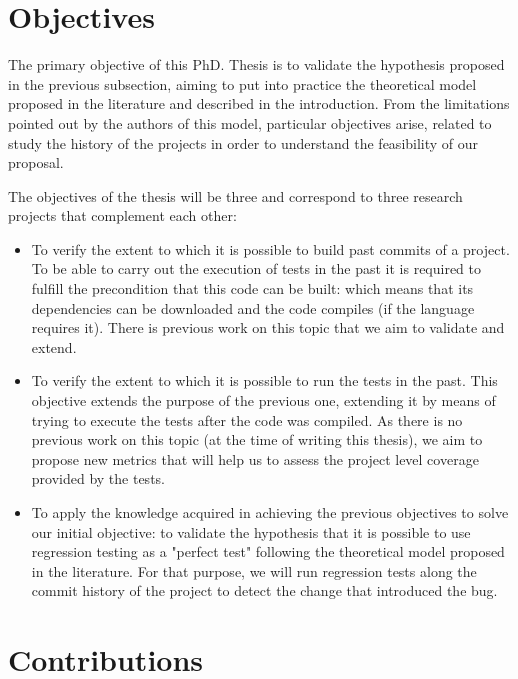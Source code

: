 \section{Objectives}

The primary objective of this PhD. Thesis is to validate the hypothesis proposed in the previous subsection, aiming to put into practice the theoretical model proposed in the literature and described in the introduction. 
From the limitations pointed out by the authors of this model, particular objectives arise, related to study the history of the projects in order to understand the feasibility of our proposal.

The objectives of the thesis will be three and correspond to three research projects that complement each other:

\begin{itemize}
    \item To verify the extent to which it is possible to build past commits of a project. To be able to carry out the execution of tests in the past it is required to fulfill the precondition that this code can be built: which means that its dependencies can be downloaded and the code compiles (if the language requires it). 
    There is previous work on this topic that we aim to validate and extend.
    \item To verify the extent to which it is possible to run the tests in the past. This objective extends the purpose of the previous one, extending it by means of trying to execute the tests after the code was compiled. As there is no previous work on this topic (at the time of writing this thesis), we aim to propose new metrics that will help us to assess the project level coverage provided by the tests.
    \item To apply the knowledge acquired in achieving the previous objectives to solve our initial objective: to validate the hypothesis that it is possible to use regression testing as a "perfect test" following the theoretical model proposed in the literature.
    For that purpose, we will run regression tests along the commit history of the project to detect the change that introduced the bug.
\end{itemize}

\section{Contributions}

